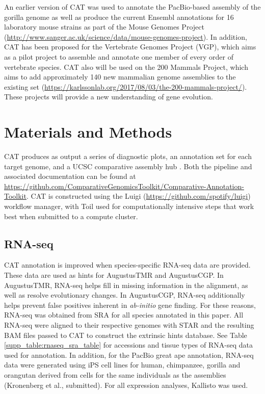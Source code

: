 \documentclass[fleqn,10pt]{wlscirep}
\begin{document}
An earlier version of CAT was used to annotate the PacBio-based assembly of the gorilla genome \cite{gordon2016long} as well as produce the current Ensembl annotations for 16 laboratory mouse strains as part of the Mouse Genomes Project (\url{http://www.sanger.ac.uk/science/data/mouse-genomes-project}). In addition, CAT has been proposed for the Vertebrate Genomes Project (VGP), which aims as a pilot project to assemble and annotate one member of every order of vertebrate species. CAT also will be used on the 200 Mammals Project, which aims to add approximately 140 new mammalian genome assemblies to the existing set (\url{https://karlssonlab.org/2017/08/03/the-200-mammals-project/}). These projects will provide a new understanding of gene evolution.

\section*{Materials and Methods}

CAT produces as output a series of diagnostic plots, an annotation set for each target genome, and a UCSC comparative assembly hub \cite{nguyen2014comparative}. Both the pipeline and associated documentation can be found at \url{https://github.com/ComparativeGenomicsToolkit/Comparative-Annotation-Toolkit}. CAT is constructed using the Luigi (\url{https://github.com/spotify/luigi}) workflow manager, with Toil \cite{vivian2017toil} used for computationally intensive steps that work best when submitted to a compute cluster. 

\subsection*{RNA-seq}

CAT annotation is improved when species-specific RNA-seq data are provided. These data are used as hints for AugustusTMR and AugustusCGP. In AugustusTMR, RNA-seq helps fill in missing information in the alignment, as well as resolve evolutionary changes. In AugustusCGP, RNA-seq additionally helps prevent false positives inherent in \textit{ab-initio} gene finding. For these reasons, RNA-seq was obtained from SRA for all species annotated in this paper. All RNA-seq were aligned to their respective genomes with STAR \cite{dobin2013star} and the resulting BAM files passed to CAT to construct the extrinsic hints database. See Table \ref{supp_table:rnaseq_sra_table} for accessions and tissue types of RNA-seq data used for annotation. In addition, for the PacBio great ape annotation, RNA-seq data were generated using iPS cell lines for human, chimpanzee, gorilla and orangutan derived from cells for the same individuals as the assemblies (Kronenberg et al., submitted). For all expression analyses, Kallisto \cite{bray2015near} was used.
\end{document}
